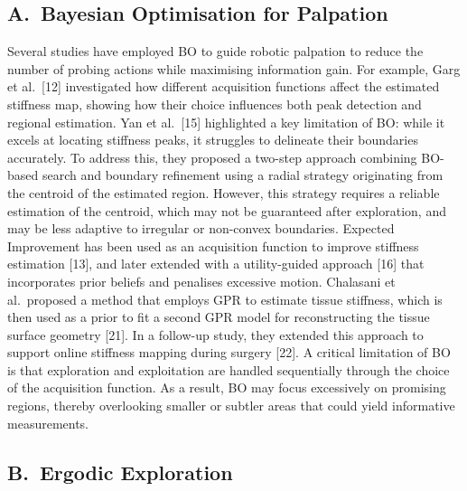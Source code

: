 \documentclass[11pt]{article}
\begin{document}
\subsection*{A.\ Bayesian Optimisation for Palpation}

Several studies have employed BO to guide robotic palpation to reduce
the number of probing actions while maximising information gain. For
example, Garg et al.\ [12] investigated how different acquisition
functions affect the estimated stiffness map, showing how their
choice influences both peak detection and regional estimation. Yan
et al.\ [15] highlighted a key limitation of BO: while it excels at
locating stiffness peaks, it struggles to delineate their boundaries
accurately. To address this, they proposed a two-step approach
combining BO-based search and boundary refinement using a radial
strategy originating from the centroid of the estimated region.
However, this strategy requires a reliable estimation of the
centroid, which may not be guaranteed after exploration, and may be
less adaptive to irregular or non-convex boundaries. Expected
Improvement has been used as an acquisition function to improve
stiffness estimation [13], and later extended with a utility-guided
approach [16] that incorporates prior beliefs and penalises excessive
motion. Chalasani et al.\ proposed a method that employs GPR to
estimate tissue stiffness, which is then used as a prior to fit a
second GPR model for reconstructing the tissue surface geometry [21].
In a follow-up study, they extended this approach to support online
stiffness mapping during surgery [22]. A critical limitation of BO
is that exploration and exploitation are handled sequentially through
the choice of the acquisition function. As a result, BO may focus
excessively on promising regions, thereby overlooking smaller or
subtler areas that could yield informative measurements.

\subsection*{B.\ Ergodic Exploration}
\end{document}
